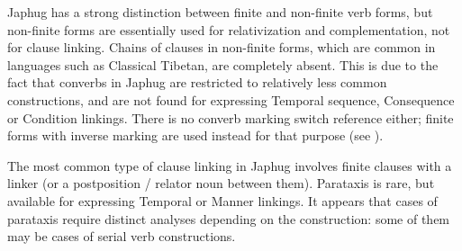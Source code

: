 \documentclass[oldfontcommands,oneside,a4paper,11pt]{article}
\begin{document}
Japhug has a strong distinction between finite and non-finite verb forms, but non-finite forms are essentially used for relativization and complementation, not for clause linking. Chains of clauses in non-finite forms, which are common in languages such as Classical Tibetan, are completely absent. This is due to the fact that converbs in Japhug are restricted to   relatively less common constructions, and are not found for expressing  Temporal sequence, Consequence or Condition linkings. There is no converb marking switch reference either; finite forms with inverse marking are used instead for that purpose (see \citealt{jacques10inverse}).

The most common type of clause linking in Japhug involves finite clauses with  a linker (or a postposition / relator noun between them). Parataxis is rare, but available for expressing Temporal  or Manner linkings. It appears that cases of parataxis require distinct analyses depending on the construction: some of them may be cases of serial verb constructions.



\end{document}
